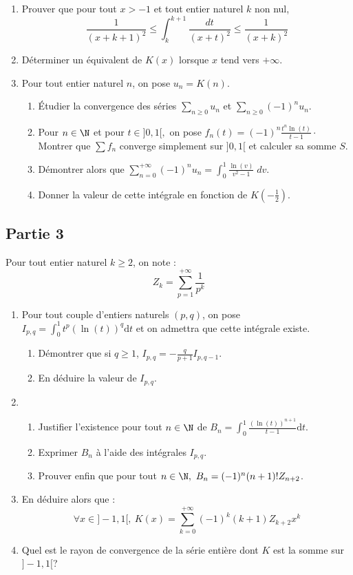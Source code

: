 \documentclass[twoside,french,11pt]{VcCours}
\newcommand{\dt}{\text{d}t}
\begin{document}
\begin{enumerate}
\item Prouver que pour tout $x>-1$ et tout entier naturel $k$ non nul,
\[\frac{1}{(x+k+1)^2}\leq \int_k^{k+1}\frac{dt}{(x+t)^2}\leq \frac{1}{(x+k)^2}\]
\item Déterminer un équivalent de $K(x)$ lorsque $x$ tend vers $+\infty$.
\item Pour tout entier naturel $n$, on pose $u_n=K(n)$.
\begin{enumerate}
	\item Étudier la convergence des séries $\sum_{n\geq 0}u_n$ et $\sum_{n\geq 0}(-1)^nu_n$.
	\item Pour $n\in\N$ et pour $t\in]0,1[,$ on pose $f_n(t)=(-1)^n\frac{t^{n}\ln(t)}{t-1} \cdot$\\
	Montrer que $\sum f_n$ converge simplement sur $]0,1[$ et calculer sa somme $S$.
	\item Démontrer alors que
$\sum_{n=0}^{+\infty}(-1)^nu_n=\int_0^1\frac{\ln(v)}{v^2-1}\;dv.$
\item Donner la valeur de cette intégrale en fonction de $K\left (-\frac{1}{2}\right )$.
\end{enumerate}
\end{enumerate}

\subsection*{Partie 3}

Pour tout entier naturel $k\geq 2$, on note :
\[Z_k=\sum_{p=1}^{+\infty}\frac{1}{p^k}\]
\begin{enumerate}
	\item Pour tout couple d'entiers naturels $(p,q)$, on pose $I_{p,q}=\int_0^1t^p(\ln(t))^q\dt$ et on admettra que cette intégrale existe.
	\begin{enumerate}
		\item Démontrer que si $q\geq 1$, $I_{p,q}=-\frac{q}{p+1}I_{p,q-1}$.
\item En déduire la valeur de $I_{p,q}$.
\end{enumerate}
\item
\begin{enumerate}
	\item Justifier l'existence pour tout $n\in \N$ de $B_n=\int_0^1 \frac{(\ln(t))^{n+1}}{t-1}\dt$.
	\item Exprimer $B_n$ à l'aide des intégrales $I_{p,q}$.
	
\item Prouver enfin que pour tout $n\in \N,\ B_n=(-1)^n(n+1)!Z_{n+2}$.
\end{enumerate}
\item En déduire alors que :
\[\forall x\in ]-1,1[,\ K(x)=\sum_{k=0}^{+\infty}(-1)^k(k+1)Z_{k+2}x^k\]
\item Quel est le rayon de convergence de la série entière dont $K$ est la somme sur $]-1,1[$?
\end{enumerate}
\end{document}
